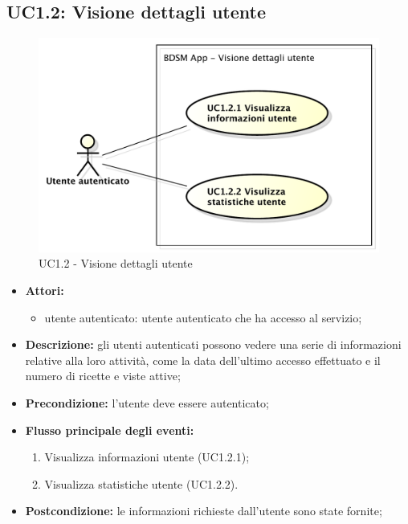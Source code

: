 \subsection{UC1.2: Visione dettagli utente}
\begin{figure}[htbp]
	\centering
	\centerline{\includegraphics[scale=0.45]{./images/UC1_2.pdf}}
	\caption{UC1.2 - Visione dettagli utente}
\end{figure}

\begin{itemize}
	\item \textbf{Attori:}
	\begin{itemize}
		\item utente autenticato: utente autenticato che ha accesso al servizio;
	\end{itemize}
	\item \textbf{Descrizione:} gli utenti autenticati possono vedere una serie di informazioni relative alla 	loro attività, come la data dell'ultimo accesso effettuato e il numero di ricette e viste attive;
	\item \textbf{Precondizione:} l'utente deve essere autenticato;
	\item \textbf{Flusso principale degli eventi:}
	\begin{enumerate}
		\item Visualizza informazioni utente (UC1.2.1);
		\item Visualizza statistiche utente (UC1.2.2).
	\end{enumerate}
	\item \textbf{Postcondizione:} le informazioni richieste dall'utente sono state fornite;
\end{itemize}

